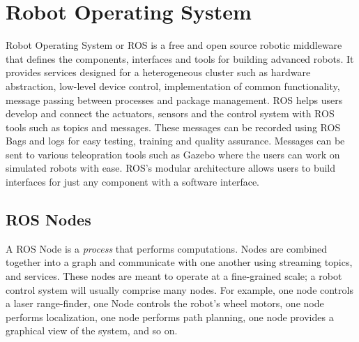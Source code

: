 \documentclass{LTHthesis}
\begin{document}
        \section{Robot Operating System} \label{ROS}%
        Robot Operating System or ROS is a free and open source robotic middleware that defines the components, interfaces and tools for building advanced robots. It provides services designed for a heterogeneous cluster such as hardware abstraction, low-level device control, implementation of common functionality, message passing between processes and package management. ROS helps users develop and connect the actuators, sensors and the control system with ROS tools such as topics and messages. These messages can be recorded using ROS Bags and logs for easy testing, training and quality assurance. Messages can be sent to various teleopration tools such as Gazebo where the users can work on simulated robots with ease. ROS's modular architecture allows users to build interfaces for just any component with a software interface.

        \subsection{ROS Nodes} %
        A ROS Node is a \emph{process} that performs computations.  Nodes are combined together into a graph and communicate with one another using streaming topics, and services. These nodes are meant to operate at a fine-grained scale; a robot control system will usually comprise many nodes. For example, one node controls a laser range-finder, one Node controls the robot's wheel motors, one node performs localization, one node performs path planning, one node provides a graphical view of the system, and so on. 
\end{document}
